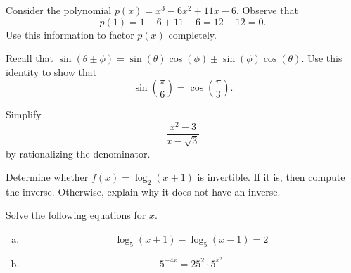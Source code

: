 \documentclass[12pt]{amsart}
\begin{document}
\newpage

\begin{thm}[10 Points]
	Consider the polynomial $p(x) = x^3 - 6x^2 + 11x - 6$.
	Observe that 
	$$p(1) = 1 - 6 + 11 - 6 = 12 - 12 = 0.$$
	Use this information to factor $p(x)$ completely.
	\vspace{3.5in}
\end{thm}

\begin{thm}[10 Points]
	Recall that $\sin(\theta \pm \phi) = \sin(\theta)\cos(\phi) \pm \sin(\phi)\cos(\theta)$.
	Use this identity to show that
	$$\sin\left(\frac{\pi}{6}\right) = \cos\left(\frac{\pi}{3}\right).$$
\end{thm}

\newpage

\begin{thm}[10 Points]
	Simplify 
	$$\frac{x^2 - 3}{x - \sqrt{3}}$$
	by rationalizing the denominator.
	\vspace{3in}
\end{thm}

\begin{thm}[10 Points]\label{ex4}
  Determine whether $f(x) = \log_2(x + 1)$ is invertible.
  If it is, then compute the inverse.  
  Otherwise, explain why it does not have an inverse.
\end{thm}

\newpage

\begin{thm}[10 Points]\label{ex5}
  Solve the following equations for $x$.
  \begin{enumerate}[(a)]
  \item
    $$\log_5(x + 1) - \log_5(x - 1) = 2$$
    \vspace{3.5in}
  \item
    $$5^{-4x} = 25^2 \cdot 5^{x^2}$$
  \end{enumerate}
\end{thm}
\end{document}
